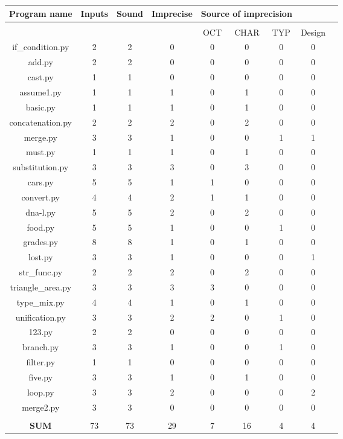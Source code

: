 \begin{tabular} {c |c|c|c|c|c|c|c|c}
	Program name & Inputs & Sound & Imprecise & \multicolumn{3}{c}{ Source of imprecision } & & \\
	\hline \\ 
	& & & & OCT & CHAR & TYP & Design \\
	if_condition.py & 2 & 2 & 0 & 0 & 0 & 0 & 0\\
	add.py & 2 & 2 & 0 & 0 & 0 & 0 & 0 \\
	cast.py & 1 & 1 & 0 & 0 & 0 & 0 & 0 \\
	assume1.py & 1 & 1 & 1 & 0 & 1 & 0 & 0\\
	basic.py & 1 & 1 & 1 & 0 & 1 & 0 & 0 \\
	concatenation.py & 2 & 2 & 2 & 0 & 2 & 0 & 0 \\
	merge.py & 3 & 3 & 1 & 0 & 0 & 1 & 1 \\
	must.py & 1 & 1 & 1 & 0 & 1 & 0 & 0 \\
	substitution.py & 3 & 3 & 3 & 0 & 3 & 0 & 0\\
	cars.py & 5 & 5 & 1 & 1 & 0 & 0 & 0 \\
	convert.py & 4 & 4 & 2 & 1 & 1 & 0 & 0 \\
	dna-l.py & 5 & 5 & 2 & 0 & 2 & 0 & 0\\
	food.py & 5 & 5 & 1 & 0 & 0 & 1 & 0 \\
	grades.py & 8 & 8 & 1 & 0 & 1 & 0 & 0 \\
	lost.py & 3 & 3 & 1 & 0 & 0 & 0 & 1  \\
	str_func.py & 2 & 2 & 2 & 0 & 2 & 0 & 0 \\
	triangle_area.py & 3 & 3 & 3 & 3 & 0 & 0 & 0 \\
	type_mix.py & 4 & 4 & 1 & 0 & 1 & 0 & 0 \\
	unification.py & 3 & 3 & 2 & 2 & 0 & 1 & 0 \\
	123.py & 2 & 2 & 0 & 0 & 0 & 0 & 0 \\
	branch.py & 3 & 3 & 1 & 0 & 0 & 1 & 0  \\
	filter.py & 1 & 1 & 0 & 0 & 0 & 0 & 0 \\
	five.py & 3 & 3 & 1 & 0 & 1 & 0 & 0 \\
	loop.py & 3 & 3 & 2 & 0 & 0 & 0 & 2  \\
	merge2.py & 3 & 3 & 0 & 0 & 0 & 0 & 0 \\
	\hline \\
	\textbf{SUM} & 73 & 73 & 29 & 7 & 16 & 4 & 4 & \\
\end{tabular} 
